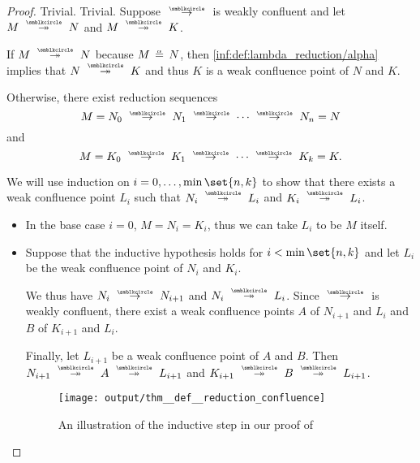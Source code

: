 \begin{proof}
   Trivial.
   Trivial.
   Suppose \( {\pred} \) is weakly confluent and let \( M \pred* N \) and \( M \pred* K \).

  If \( M \pred* N \) because \( M \aequiv N \), then \ref{inf:def:lambda_reduction/alpha} implies that \( N \pred* K \) and thus \( K \) is a weak confluence point of \( N \) and \( K \).

  Otherwise, there exist reduction sequences
  \begin{equation*}
    M = N_0 \pred N_1 \pred \cdots \pred N_n = N
  \end{equation*}
  and
  \begin{equation*}
    M = K_0 \pred K_1 \pred \cdots \pred K_k = K.
  \end{equation*}

  We will use induction on \( i = 0, \ldots, \min\set{ n, k } \) to show that there exists a weak confluence point \( L_i \) such that \( N_i \pred* L_i \) and \( K_i \pred* L_i \).

  \begin{itemize}
    \item In the base case \( i = 0 \), \( M = N_i = K_i \), thus we can take \( L_i \) to be \( M \) itself.

    \item Suppose that the inductive hypothesis holds for \( i < \min\set{ n, k } \) and let \( L_i \) be the weak confluence point of \( N_i \) and \( K_i \).

    We thus have \( N_i \pred N_{i+1} \) and \( N_i \pred* L_i \). Since \( {\pred} \) is weakly confluent, there exist a weak confluence points \( A \) of \( N_{i+1} \) and \( L_i \) and \( B \) of \( K_{i+1} \) and \( L_i \).

    Finally, let \( L_{i+1} \) be a weak confluence point of \( A \) and \( B \). Then \( N_{i+1} \pred* A \pred* L_{i+1} \) and \( K_{i+1} \pred* B \pred* L_{i+1} \).

    \begin{figure}[!ht]
      \centering
      \texttt{[image: output/thm\_\_def\_\_reduction\_confluence]}
      \caption{An illustration of the inductive step in our proof of }\label{fig:thm:confluence_of_reflexive_transitive_closure}
    \end{figure}
  \end{itemize}


\end{proof}
